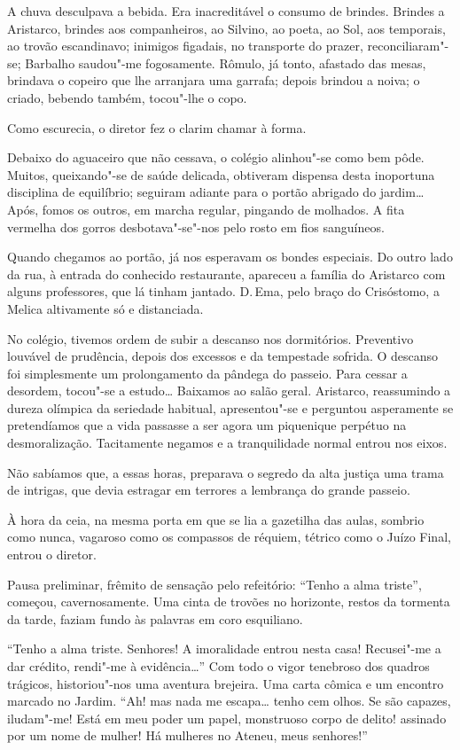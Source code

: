 A chuva desculpava a bebida.
Era inacreditável o consumo de brindes. Brindes a Aristarco, brindes
aos companheiros, ao Silvino, ao poeta, ao Sol, aos temporais, ao
trovão escandinavo; inimigos figadais, no transporte do prazer,
reconciliaram"-se; Barbalho saudou"-me fogosamente. Rômulo, já tonto,
afastado das mesas, brindava o copeiro que lhe arranjara uma garrafa;
depois brindou a noiva; o criado, bebendo também, tocou"-lhe o copo.

Como escurecia, o diretor fez o clarim chamar à forma. 

Debaixo do aguaceiro que não cessava, o colégio alinhou"-se como bem pôde.
Muitos, queixando"-se de saúde delicada, obtiveram dispensa desta
inoportuna disciplina de equilíbrio; seguiram adiante para o portão
abrigado do jardim\ldots{} Após, fomos os outros, em marcha regular,
pingando de molhados. A fita vermelha dos gorros desbotava"-se"-nos
pelo rosto em fios sanguíneos. 

Quando chegamos ao portão, já nos
esperavam os bondes especiais. Do outro lado da rua, à entrada do
conhecido restaurante, apareceu a família do Aristarco com alguns
professores, que lá tinham jantado. D.\,Ema, pelo braço do Crisóstomo, a
Melica altivamente só e distanciada. 

No colégio, tivemos ordem de subir
a descanso nos dormitórios. Preventivo louvável de prudência, depois
dos excessos e da tempestade sofrida. O descanso foi simplesmente um
prolongamento da pândega do passeio. Para cessar a desordem, tocou"-se
a estudo\ldots{} Baixamos ao salão geral. Aristarco, reassumindo a dureza
olímpica da seriedade habitual, apresentou"-se e perguntou asperamente
se pretendíamos que a vida passasse a ser agora um piquenique perpétuo
na desmoralização. Tacitamente negamos e a tranquilidade normal entrou
nos eixos. 

Não sabíamos que, a essas horas, preparava o segredo da alta
justiça uma trama de intrigas, que devia estragar em terrores a
lembrança do grande passeio. 

À hora da ceia, na mesma porta em que se
lia a gazetilha das aulas, sombrio como nunca, vagaroso como os
compassos de réquiem, tétrico como o Juízo Final, entrou o diretor.

Pausa preliminar, frêmito de sensação pelo refeitório: ``Tenho a alma
triste'', começou, cavernosamente. Uma cinta de trovões no 
horizonte, restos da tormenta da
tarde, faziam fundo às palavras em coro esquiliano. 

``Tenho a alma triste. Senhores! A imoralidade entrou nesta casa! 
Recusei"-me a dar crédito, rendi"-me à evidência\ldots{}'' 
Com todo o vigor tenebroso dos
quadros trágicos, historiou"-nos uma aventura brejeira. Uma carta
cômica e um encontro marcado no Jardim. ``Ah! mas nada me escapa\ldots{}
tenho cem olhos. Se são capazes, iludam"-me! Está em meu poder um
papel, monstruoso corpo de delito! assinado por um nome de mulher! Há
mulheres no Ateneu, meus senhores!'' 

